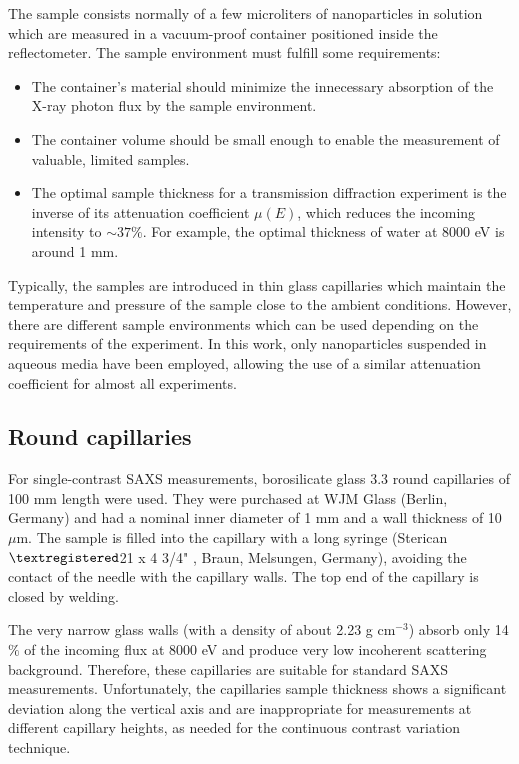 The sample consists normally of a few microliters of nanoparticles in solution which are measured in a vacuum-proof container positioned inside the reflectometer. The sample environment must fulfill some requirements:

\begin{itemize}
        \item The container's material should minimize the innecessary absorption of the X-ray photon flux by the sample environment.
        \item The container volume should be small enough to enable the measurement of valuable, limited samples.
        \item The optimal sample thickness for a transmission diffraction experiment is the inverse of its attenuation coefficient $\mu(E)$, which reduces the incoming intensity to $\sim37\%$. For example, the optimal thickness of water at 8000 eV is around 1 mm.
\end{itemize}

Typically, the samples are introduced in thin glass capillaries which maintain the temperature and pressure of the sample close to the ambient conditions. However, there are different sample environments which can be used depending on the requirements of the experiment. In this work, only nanoparticles suspended in aqueous media have been employed, allowing the use of a similar attenuation coefficient for almost all experiments.

\subsection{Round capillaries}

For single-contrast SAXS measurements, borosilicate glass 3.3 round capillaries of 100 mm length were used. They were purchased at WJM Glass (Berlin, Germany) and had a nominal inner diameter of 1 mm and a wall thickness of 10 $\mu$m. The sample is filled into the capillary with a long syringe (Sterican$\textregistered$21 x 4 3/4" , Braun, Melsungen, Germany), avoiding the contact of the needle with the capillary walls. The top end of the capillary is closed by welding.

The very narrow glass walls (with a density of about 2.23 g cm$^{-3}$) absorb only 14 $\%$ of the incoming flux at 8000 eV and produce very low incoherent scattering background. Therefore, these capillaries are suitable for standard SAXS measurements. Unfortunately, the capillaries sample thickness shows a significant deviation along the vertical axis and are inappropriate for measurements at different capillary heights, as needed for the continuous contrast variation technique.

